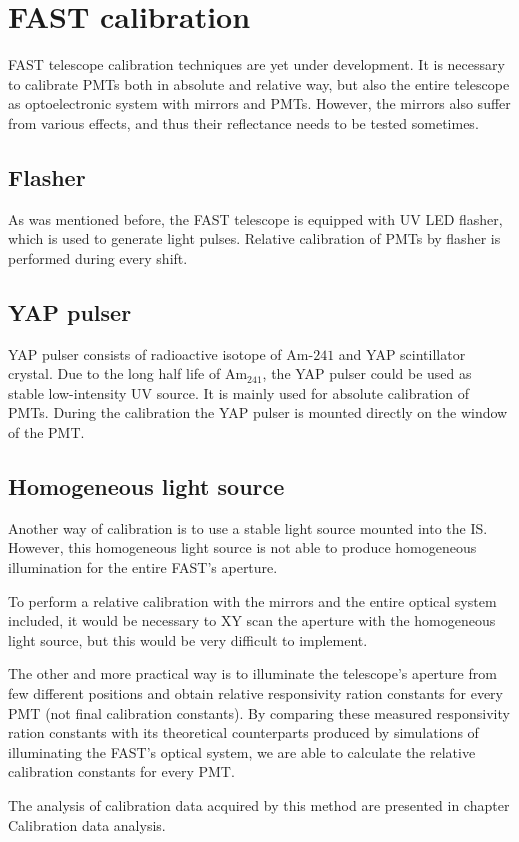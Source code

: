 \section{FAST calibration}
FAST telescope calibration techniques are yet under development. It is necessary to calibrate PMTs both in absolute and relative way, but also the entire telescope as optoelectronic system with mirrors and PMTs. However, the mirrors also suffer from various effects, and thus their reflectance needs to be tested sometimes.
\subsection{Flasher}
As was mentioned before, the FAST telescope is equipped with UV LED flasher, which is used to generate light pulses. Relative calibration of PMTs by flasher is performed during every shift.
\subsection{YAP pulser}
YAP pulser consists of radioactive isotope of $\textrm{Am-241}$ and YAP scintillator crystal. Due to the long half life of $\textrm{Am}_{241}$, the YAP pulser could be used as stable low-intensity UV source. 
It is mainly used for absolute calibration of PMTs. During the calibration the YAP pulser is mounted directly on the window of the PMT.

\subsection{Homogeneous light source}
Another way of calibration is to use a stable light source mounted into the IS. However, this homogeneous light source is not able to produce homogeneous illumination for the entire FAST's aperture.  
\par
To perform a relative calibration with the mirrors and the entire optical system included, it would be necessary to XY scan the aperture with the homogeneous light source, but this would be very difficult to implement.   

\par
The other and more practical way is to illuminate the telescope's aperture from few different positions and obtain relative responsivity ration constants for every PMT (not final calibration constants). By comparing these measured responsivity ration constants with its theoretical counterparts produced by simulations of illuminating the FAST's optical system, we are able to calculate the relative calibration constants for every PMT.       
\par
The analysis of calibration data acquired by this method are presented in chapter Calibration data analysis.

